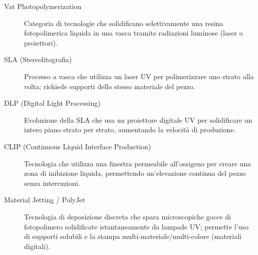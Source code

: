\vspace{0.5cm}
\noindent{\large\sffamily\bfseries\textcolor{black!60}{Fabbricazione Additiva (Polimeri Liquidi)}}\par
\begin{description}
    \item [Vat Photopolymerization] Categoria di tecnologie che solidificano selettivamente una resina fotopolimerica liquida in una vasca tramite radiazioni luminose (laser o proiettori).
    \item [SLA (Stereolitografia)] Processo a vasca che utilizza un laser UV per polimerizzare uno strato alla volta; richiede supporti dello stesso materiale del pezzo.
    \item [DLP (Digital Light Processing)] Evoluzione della SLA che usa un proiettore digitale UV per solidificare un intero piano strato per strato, aumentando la velocità di produzione.
    \item [CLIP (Continuous Liquid Interface Production)] Tecnologia che utilizza una finestra permeabile all'ossigeno per creare una zona di inibizione liquida, permettendo un'elevazione continua del pezzo senza interruzioni.
    \item [Material Jetting / PolyJet] Tecnologia di deposizione discreta che spara microscopiche gocce di fotopolimero solidificate istantaneamente da lampade UV; permette l'uso di supporti solubili e la stampa multi-materiale/multi-colore (materiali digitali).
\end{description}

